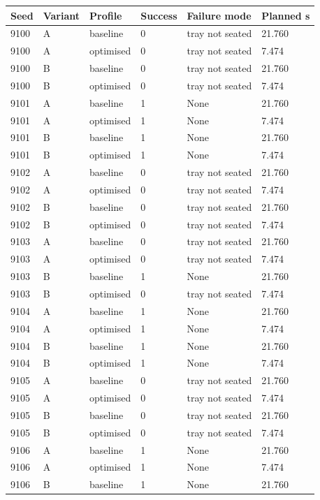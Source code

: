 \begin{longtable}{llllll}
\toprule
Seed & Variant & Profile & Success & Failure mode & Planned s \\
\midrule
\endhead
9100 & A & baseline & 0 & tray not seated & 21.760 \\
9100 & A & optimised & 0 & tray not seated & 7.474 \\
9100 & B & baseline & 0 & tray not seated & 21.760 \\
9100 & B & optimised & 0 & tray not seated & 7.474 \\
9101 & A & baseline & 1 & None & 21.760 \\
9101 & A & optimised & 1 & None & 7.474 \\
9101 & B & baseline & 1 & None & 21.760 \\
9101 & B & optimised & 1 & None & 7.474 \\
9102 & A & baseline & 0 & tray not seated & 21.760 \\
9102 & A & optimised & 0 & tray not seated & 7.474 \\
9102 & B & baseline & 0 & tray not seated & 21.760 \\
9102 & B & optimised & 0 & tray not seated & 7.474 \\
9103 & A & baseline & 0 & tray not seated & 21.760 \\
9103 & A & optimised & 0 & tray not seated & 7.474 \\
9103 & B & baseline & 1 & None & 21.760 \\
9103 & B & optimised & 0 & tray not seated & 7.474 \\
9104 & A & baseline & 1 & None & 21.760 \\
9104 & A & optimised & 1 & None & 7.474 \\
9104 & B & baseline & 1 & None & 21.760 \\
9104 & B & optimised & 1 & None & 7.474 \\
9105 & A & baseline & 0 & tray not seated & 21.760 \\
9105 & A & optimised & 0 & tray not seated & 7.474 \\
9105 & B & baseline & 0 & tray not seated & 21.760 \\
9105 & B & optimised & 0 & tray not seated & 7.474 \\
9106 & A & baseline & 1 & None & 21.760 \\
9106 & A & optimised & 1 & None & 7.474 \\
9106 & B & baseline & 1 & None & 21.760 \\

\end{longtable}
